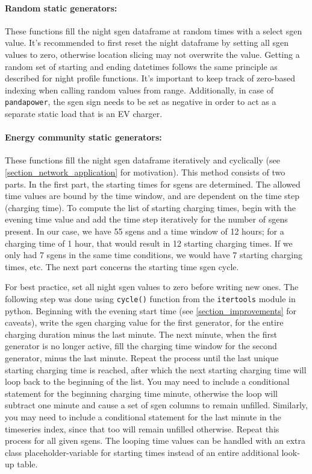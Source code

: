 \documentclass[a4paper,10pt]{report}
\begin{document}
\paragraph{Random static generators:} These functions fill the night sgen dataframe at random times with a select sgen value. It's recommended to first reset the night dataframe by setting all sgen values to zero, otherwise location slicing may not overwrite the value. Getting a random set of starting and ending datetimes follows the same principle as described for night profile functions. It's important to keep track of zero-based indexing when calling random values from range. Additionally, in case of \texttt{pandapower}, the sgen sign needs to be set as negative in order to act as a separate static load that is an EV charger.

\paragraph{Energy community static generators:} These functions fill the night sgen dataframe iteratively and cyclically (see \cref{section_network_application} for motivation). This method consists of two parts. In the first part, the starting times for sgens are determined. The allowed time values are bound by the time window, and are dependent on the time step (charging time). To compute the list of starting charging times, begin with the evening time value and add the time step iteratively for the number of sgens present. In our case, we have 55 sgens and a time window of 12 hours; for a charging time of 1 hour, that would result in 12 starting charging times. If we only had 7 sgens in the same time conditions, we would have 7 starting charging times, etc. The next part concerns the starting time sgen cycle.

For best practice, set all night sgen values to zero before writing new ones. The following step was done using \texttt{cycle()} function from the \texttt{itertools} module in python. Beginning with the evening start time (see \cref{section_improvements} for caveats), write the sgen charging value for the first generator, for the entire charging duration minus the last minute. The next minute, when the first generator is no longer active, fill the charging time window for the second generator, minus the last minute. Repeat the process until the last unique starting charging time is reached, after which the next starting charging time will loop back to the beginning of the list. You may need to include a conditional statement for the beginning charging time minute, otherwise the loop will subtract one minute and cause a set of sgen columns to remain unfilled. Similarly, you may need to include a conditional statement for the last minute in the timeseries index, since that too will remain unfilled otherwise. Repeat this process for all given sgens. The looping time values can be handled with an extra class placeholder-variable for starting times instead of an entire additional look-up table.
\end{document}
